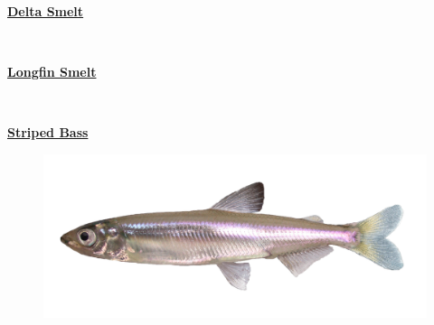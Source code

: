\documentclass[
]{book}
\begin{document}
\begin{panel-grid}

\begin{columns-nocenter}

\begin{column800}

\textbf{\href{http://calfish.ucdavis.edu/species/?uid=47\&ds=698}{Delta Smelt}}

\end{column800}

\begin{column40}

~

\end{column40}

\begin{column800}

\textbf{\href{http://calfish.ucdavis.edu/species/?uid=87\&ds=698}{Longfin Smelt}}

\end{column800}

\begin{column40}

~

\end{column40}

\begin{column800}

\textbf{\href{http://calfish.ucdavis.edu/species/?uid=160\&ds=698}{Striped Bass}}

\end{column800}

\end{columns-nocenter}

\begin{columns-nocenter}

\begin{column800}

\begin{figure}

{\centering \includegraphics[width=29.17in]{figures/delta_smelt} 

}
\end{figure}
\end{column800}
\end{columns-nocenter}
\end{panel-grid}
\end{document}

